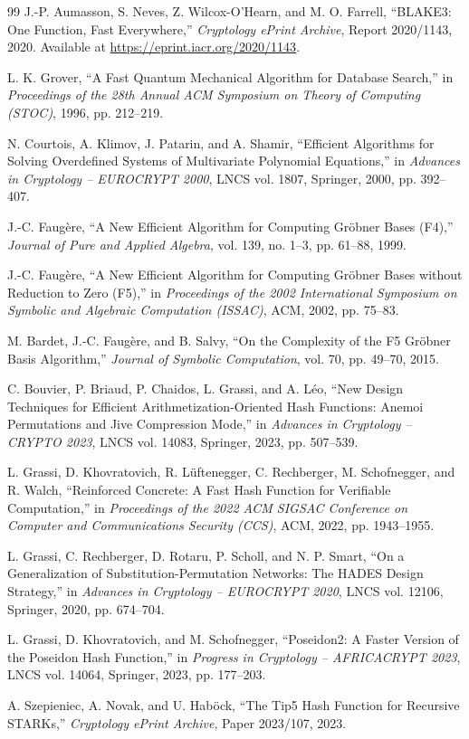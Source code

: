﻿\documentclass[english]{aucmcs}
\begin{document}
\begin{thebibliography}{99}
J.-P. Aumasson, S. Neves, Z. Wilcox-O'Hearn, and M. O. Farrell,
``BLAKE3: One Function, Fast Everywhere,''
\emph{Cryptology ePrint Archive}, Report 2020/1143, 2020.
Available at \url{https://eprint.iacr.org/2020/1143}.

L. K. Grover,
``A Fast Quantum Mechanical Algorithm for Database Search,''
in \emph{Proceedings of the 28th Annual ACM Symposium on Theory of Computing (STOC)},
1996, pp. 212--219.

N. Courtois, A. Klimov, J. Patarin, and A. Shamir,
``Efficient Algorithms for Solving Overdefined Systems of Multivariate Polynomial
Equations,''
in \emph{Advances in Cryptology -- EUROCRYPT 2000},
LNCS vol. 1807, Springer, 2000, pp. 392--407.

J.-C. Faug\`ere,
``A New Efficient Algorithm for Computing Gr\"obner Bases (F4),'' 
\emph{Journal of Pure and Applied Algebra},
vol. 139, no. 1--3, pp. 61--88, 1999.

J.-C. Faug\`ere,
``A New Efficient Algorithm for Computing Gr\"obner Bases without Reduction to Zero (F5),''
in \emph{Proceedings of the 2002 International Symposium on Symbolic and Algebraic Computation (ISSAC)},
ACM, 2002, pp. 75--83.

M. Bardet, J.-C. Faug\`ere, and B. Salvy,
``On the Complexity of the F5 Gr\"obner Basis Algorithm,''
\emph{Journal of Symbolic Computation},
vol. 70, pp. 49--70, 2015.

C. Bouvier, P. Briaud, P. Chaidos, L. Grassi, and A. L\'eo,
``New Design Techniques for Efficient Arithmetization-Oriented Hash Functions:
Anemoi Permutations and Jive Compression Mode,''
in \emph{Advances in Cryptology -- CRYPTO 2023},
LNCS vol. 14083, Springer, 2023, pp. 507--539.

L. Grassi, D. Khovratovich, R. L\"uftenegger, C. Rechberger,
M. Schofnegger, and R. Walch,
``Reinforced Concrete: A Fast Hash Function for Verifiable Computation,''
in \emph{Proceedings of the 2022 ACM SIGSAC Conference on Computer
and Communications Security (CCS)},
ACM, 2022, pp. 1943--1955.

L. Grassi, C. Rechberger, D. Rotaru, P. Scholl, and N. P. Smart,
``On a Generalization of Substitution-Permutation Networks: The HADES Design Strategy,''
in \emph{Advances in Cryptology -- EUROCRYPT 2020},
LNCS vol. 12106, Springer, 2020, pp. 674--704.

L. Grassi, D. Khovratovich, and M. Schofnegger,
``Poseidon2: A Faster Version of the Poseidon Hash Function,''
in \emph{Progress in Cryptology -- AFRICACRYPT 2023},
LNCS vol. 14064, Springer, 2023, pp. 177--203.

A. Szepieniec, A. Novak, and U. Hab\"ock,
``The Tip5 Hash Function for Recursive STARKs,''
\emph{Cryptology ePrint Archive}, Paper 2023/107, 2023.

\end{thebibliography}
\end{document}
